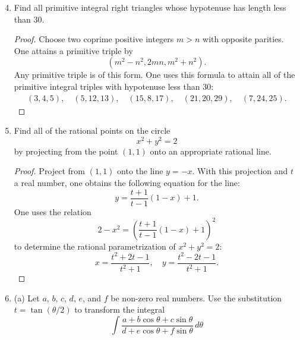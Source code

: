 \documentclass[11pt, oneside]{article}
\begin{document}
\begin{enumerate}
\setcounter{enumi}{3}
\item Find all primitive integral right triangles whose hypotenuse has length less than $30$.
\begin{proof}
Choose two coprime positive integers $m > n$ with opposite parities. One attains a primitive triple by 
$$
(m^2 - n^2, 2mn, m^2 + n^2).
$$
Any primitive triple is of this form. One uses this formula to attain all of the primitive integral triples with hypotenuse less than $30$:
\begin{align*}
(3,4,5), \quad(5,12,13), \quad(15, 8, 17), \quad(21, 20, 29), \quad(7, 24, 25).
\end{align*}
\end{proof}
\item Find all of the rational points on the circle 
$$
x^2 + y^2 = 2
$$
by projecting from the point $(1,1)$ onto an appropriate rational line. 
\begin{proof}
Project from $(1,1)$ onto the line $y=-x$. With this projection and $t$ a real number, one obtains the following equation for the line:
$$
y =  \frac{t+1}{t-1}(1-x) + 1.
$$
One uses the relation
$$
2 - x^2 = \left(\frac{t+1}{t-1}(1-x) + 1\right)^2
$$
to determine the rational parametrization of $x^2 + y^2 = 2$:
$$
x=\frac{t^2+2t-1}{t^2+1},\quad y=\frac{t^2-2t-1}{t^2+1}.
$$
\end{proof}
\item (a) Let $a$, $b$, $c$, $d$, $e$, and $f$ be non-zero real numbers. Use the substitution $t = \tan(\theta/2)$ to transform the integral 
$$
\int \frac{a+b\cos\theta + c\sin\theta}{d+e\cos\theta + f\sin \theta}\,d\theta
$$
\end{enumerate}
\end{document}

